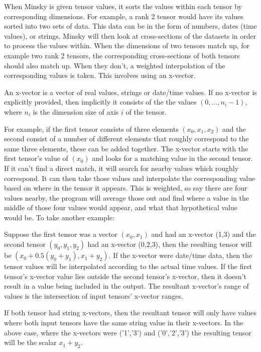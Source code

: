 When Minsky is given tensor values, it sorts the values within each
tensor by corresponding dimensions. For example, a rank 2 tensor would
have its values sorted into two sets of data. This data can be in the
form of numbers, dates (time values), or strings. Minsky will then
look at cross-sections of the datasets in order to process the values
within. When the dimensions of two tensors match up, for example two
rank 2 tensors, the corresponding cross-sections of both tensors
should also match up. When they don't, a weighted interpolation of the
corresponding values is taken. This involves using an x-vector.

An x-vector is a vector of real values, strings or date/time values.
If no x-vector is explicitly provided, then implicitly it consists of
the the values $(0,\ldots,n_i-1)$, where $n_i$ is the dimension size
of axis $i$ of the tensor.

For example, if the first tensor consists of three elements
$(x_0, x_1, x_2)$ and the second consist of a number of different
elements that roughly correspond to the same three elements, these can
be added together.  The x-vector starts with the first tensor's value
of $(x_0)$ and looks for a matching value in the second tensor. If it
can't find a direct match, it will search for nearby values which
roughly correspond. It can then take those values and interpolate the
corresponding value based on where in the tensor it appears. This is
weighted, so say there are four values nearby, the program will
average those out and find where a value in the middle of those four
values would appear, and what that hypothetical value would be. To
take another example:

Suppose the first tensor was a vector $(x_0,x_1)$ and had an x-vector
(1,3) and the second tensor $(y_0,y_1,y_2)$ had an x-vector (0,2,3),
then the resulting tensor will be $(x_0+0.5(y_0+y_1), x_1+y_2)$. If
the x-vector were date/time data, then the tensor values will be
interpolated according to the actual time values. If the first
tensor's x-vector value lies outside the second tensor's x-vector,
then it doesn't result in a value being included in the output. The
resultant x-vector's range of values is the intersection of input
tensors' x-vector ranges.

If both tensor had string x-vectors, then the resultant tensor will
only have values where both input tensors have the same string value
in their x-vectors. In the above case, where the x-vectors were
('1','3') and ('0','2','3') the resulting tensor will be the scalar
$x_1+y_2$.

